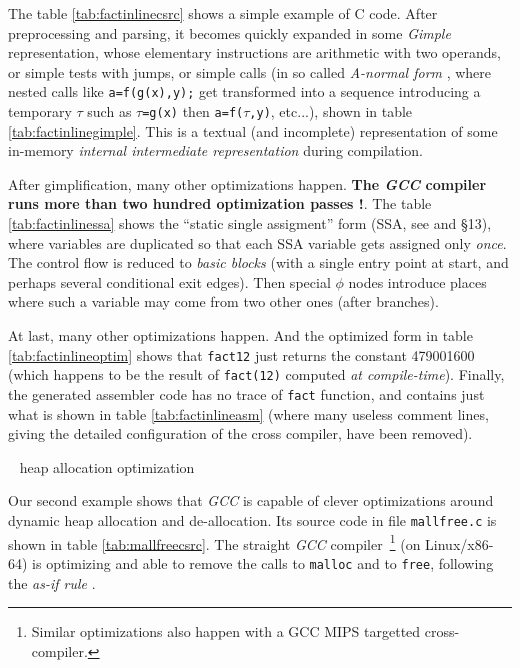 The table \ref{tab:factinlinecsrc} shows a simple example of C
code. After preprocessing and parsing, it becomes quickly expanded in
some \emph{Gimple} representation, whose elementary
instructions are arithmetic with two operands, or simple tests with
jumps, or simple calls (in so called \emph{A-normal form}
, where nested calls like \verb+a=f(g(x),y);+ get
transformed into a sequence introducing a temporary $\tau$ such as
$\tau$\verb+=g(x)+ then \verb+a=f(+$\tau$\verb+,y)+, etc...), shown in table
\ref{tab:factinlinegimple}. This is a textual (and incomplete)
representation of some in-memory \emph{internal intermediate
  representation} during compilation.



After gimplification, many other optimizations happen. \textbf{The
  \emph{GCC} compiler runs more than two hundred optimization passes
  !}. The table
\ref{tab:factinlinessa} shows the ``static single assigment'' form
(SSA, see \cite{pop:ssa} and \cite{gcc-internals} §13), where variables are duplicated so that each SSA
variable gets assigned only \emph{once}. The control flow is reduced
to  \emph{basic blocks} (with a single entry point
at start, and perhaps several conditional exit edges). Then special
$\phi$ nodes introduce places where such a variable may come from two
other ones (after branches).




At last, many other optimizations happen. And the optimized form in
table \ref{tab:factinlineoptim} shows that \texttt{fact12} just
returns the constant 479001600 (which happens to be the result of
\texttt{fact(12)} computed \emph{at compile-time}). Finally, the
generated assembler code has no trace of \texttt{fact} function, and
contains just what is shown in table \ref{tab:factinlineasm} (where
many useless comment lines, giving the detailed configuration of the
cross compiler, have been removed).


\bigskip

\newpage

{{\raisebox{3pt}{\textcolor{brown}{\rule{0.2\textwidth}{2.0pt}}}} ~ \large{heap allocation optimization}}

\bigskip

Our second example shows that \emph{GCC} is capable of clever
optimizations around dynamic heap allocation and de-allocation. Its
source code in file \texttt{mallfree.c} is shown in table
\ref{tab:mallfreecsrc}. The straight \emph{GCC}
compiler~\footnote{Similar optimizations also happen with a GCC MIPS
  targetted cross-compiler.} (on Linux/x86-64) is optimizing and able
to remove the calls to \texttt{malloc} and to \texttt{free}, following
the \emph{as-if rule} .

